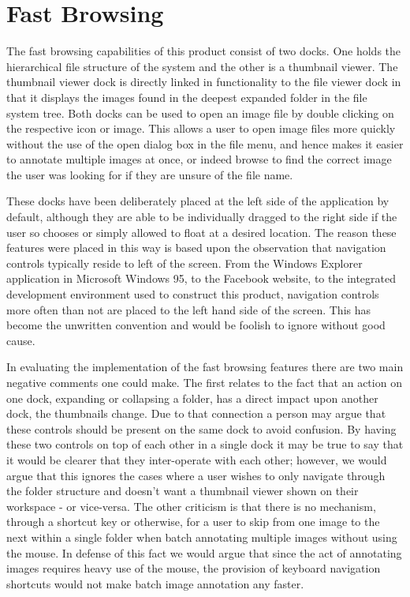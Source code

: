 \section{Fast Browsing}
The fast browsing capabilities of this product consist of two docks.  One holds the hierarchical file structure of the system and the other is a thumbnail viewer.  The thumbnail viewer dock is directly linked in functionality to the file viewer dock in that it displays the images found in the deepest expanded folder in the file system tree.  Both docks can be used to open an image file by double clicking on the respective icon or image.  This allows a user to open image files more quickly without the use of the open dialog box in the file menu, and hence makes it easier to annotate multiple images at once, or indeed browse to find the correct image the user was looking for if they are unsure of the file name.

These docks have been deliberately placed at the left side of the application by default, although they are able to be individually dragged to the right side if the user so chooses or simply allowed to float at a desired location.  The reason these features were placed in this way is based upon the observation that navigation controls typically reside to left of the screen.  From the Windows Explorer application in Microsoft Windows 95, to the Facebook website, to the integrated development environment used to construct this product, navigation controls more often than not are placed to the left hand side of the screen.  This has become the unwritten convention and would be foolish to ignore without good cause.

In evaluating the implementation of the fast browsing features there are two main negative comments one could make.  The first relates to the fact that an action on one dock, expanding or collapsing a folder, has a direct impact upon another dock, the thumbnails change.  Due to that connection a person may argue that these controls should be present on the same dock to avoid confusion.  By having these two controls on top of each other in a single dock it may be true to say that it would be clearer that they inter-operate with each other; however, we would argue that this ignores the cases where a user wishes to only navigate through the folder structure and doesn’t want a thumbnail viewer shown on their workspace - or vice-versa.  The other criticism is that there is no mechanism, through a shortcut key or otherwise, for a user to skip from one image to the next within a single folder when batch annotating multiple images without using the mouse.  In defense of this fact we would argue that since the act of annotating images requires heavy use of the mouse, the provision of keyboard navigation shortcuts would not make batch image annotation any faster.
